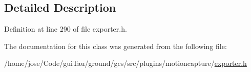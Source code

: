 \subsection{Detailed Description}


Definition at line 290 of file exporter.\-h.



The documentation for this class was generated from the following file\-:\begin{DoxyCompactItemize}
\item 
/home/jose/\-Code/gui\-Tau/ground/gcs/src/plugins/motioncapture/\hyperlink{exporter_8h}{exporter.\-h}\end{DoxyCompactItemize}
